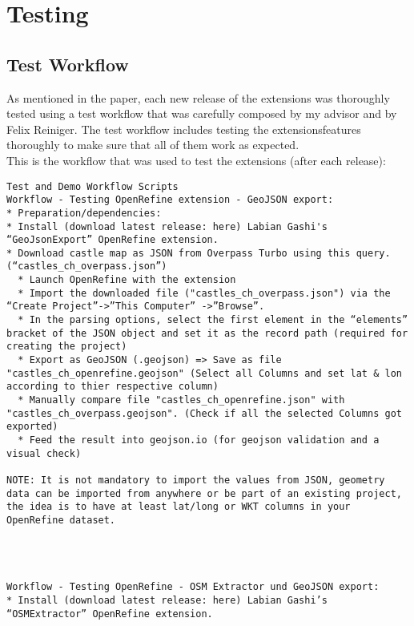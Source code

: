 \chapter{Testing}
\section{Test Workflow}\label{sec:test-workflow}
As mentioned in the paper, each new release of the extensions was thoroughly tested using a test workflow that was
carefully composed by my advisor and by Felix Reiniger. The test workflow includes testing the extensions\textquotesingle  features
thoroughly to make sure that all of them work as expected.\\
\newline
This is the workflow that was used to test the extensions (after each release):
\begin{verbatim}
Test and Demo Workflow Scripts
Workflow - Testing OpenRefine extension - GeoJSON export:
* Preparation/dependencies:
* Install (download latest release: here) Labian Gashi's “GeoJsonExport” OpenRefine extension.
* Download castle map as JSON from Overpass Turbo using this query. (“castles_ch_overpass.json”)
  * Launch OpenRefine with the extension
  * Import the downloaded file ("castles_ch_overpass.json") via the “Create Project”->”This Computer” ->”Browse”.
  * In the parsing options, select the first element in the “elements” bracket of the JSON object and set it as the record path (required for creating the project)
  * Export as GeoJSON (.geojson) => Save as file "castles_ch_openrefine.geojson" (Select all Columns and set lat & lon according to thier respective column)
  * Manually compare file "castles_ch_openrefine.json" with "castles_ch_overpass.geojson". (Check if all the selected Columns got exported)
  * Feed the result into geojson.io (for geojson validation and a visual check)

NOTE: It is not mandatory to import the values from JSON, geometry data can be imported from anywhere or be part of an existing project, the idea is to have at least lat/long or WKT columns in your OpenRefine dataset.




Workflow - Testing OpenRefine - OSM Extractor und GeoJSON export:
* Install (download latest release: here) Labian Gashi’s “OSMExtractor” OpenRefine extension.


\end{verbatim}
